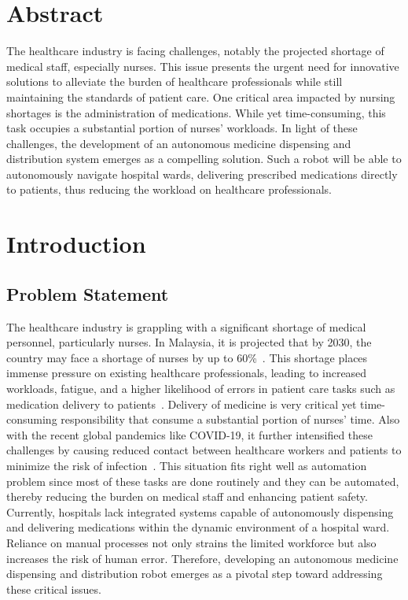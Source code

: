 \newpage

\section*{Abstract}
The healthcare industry is facing challenges, notably the projected shortage of medical staff, especially nurses. This issue presents the urgent need for innovative solutions to alleviate the burden of healthcare professionals while still maintaining the standards of patient care. One critical area impacted by nursing shortages is the administration of medications. While yet time-consuming, this task occupies a substantial portion of nurses' workloads. In light of these challenges, the development of an autonomous medicine dispensing and distribution
system emerges as a compelling solution. Such a robot will be able to autonomously navigate hospital wards, delivering prescribed medications directly to patients, thus reducing the workload on healthcare professionals.  


\newpage

\section{Introduction}
\subsection{Problem Statement}
The healthcare industry is grappling with a significant shortage of medical personnel, particularly nurses. 
In Malaysia, it is projected that by 2030, the country may face a shortage of nurses by up to 60\%~\cite{dzulkefly2024nursing}.
This shortage places immense pressure on existing healthcare professionals, leading to increased workloads, fatigue, and a higher likelihood of errors in patient care tasks such as medication delivery to patients~\cite{kennedy2003nursing}. 
Delivery of medicine is very critical yet time-consuming responsibility that consume a substantial portion of nurses' time. 
Also with the recent global pandemics like COVID-19, it further intensified these challenges by causing reduced contact between healthcare workers and patients to minimize the risk of infection~\cite{fawaz2020nurses}.
This situation fits right well as automation problem since most of these tasks are done routinely and they can be automated, thereby reducing the burden on medical staff and enhancing patient safety.
Currently, hospitals lack integrated systems capable of autonomously dispensing and delivering medications within the dynamic environment of a hospital ward. Reliance on manual processes not only strains the limited workforce but also increases the risk of human error. Therefore, developing an autonomous medicine dispensing and distribution robot emerges as a pivotal step toward addressing these critical issues.


